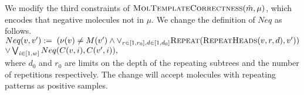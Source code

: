We modify the third constraints of $ \textsc{MolTemplateCorrectness}(\hat{m},\mu)$, which encodes that negative molecules not in $\mu$. We change the definition of $Neq$ as follows.\\
$Neq(v, v') :=\; (\nu(v) \neq M(v') \land \lor_{r\in[1,r_0],d\in[1,d_0]}\textsc{Repeat}(\textsc{RepeatHeads}(v,r,d), v')) $\\
\mbox{}\hspace{30mm}$\lor \bigvee_{{i \in [1,w]}} Neq( C(v,i), C(v',i ) ),$\\
where $d_0$ and $r_0$ are limits on the depth of the repeating subtrees and the number of repetitions respectively.
The change will accept molecules with repeating patterns as positive samples.

